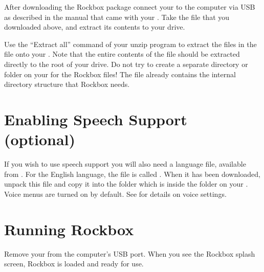 After downloading the Rockbox package connect your \dap{} to the computer via
USB as described in the manual that came with your \dap{}. Take the file that
you downloaded above, and extract its contents to your \daps{} drive.

Use the ``Extract all'' command of your unzip program to extract the files in
the  file onto your \dap{}. Note that the entire contents of the
 file should be extracted directly to the root of your \daps{}
drive. Do not try to create a separate directory or folder on your \dap{} for
the Rockbox files! The  file already contains the internal
directory structure that Rockbox needs.


\section{Enabling Speech Support (optional)}\label{sec:enabling_speech_support}
If you wish to use speech support you will also need a language file, available
from . For the English language, the file is called
. When it has been downloaded, unpack this file and copy
it into the  folder which is inside the  folder on
your \dap{}. Voice menus are turned on by default. See
 for details on voice settings.

\section{Running Rockbox}
Remove your \dap{} from the computer's USB port.%
%
%
When you see the Rockbox splash screen, Rockbox is loaded and ready for
use.

